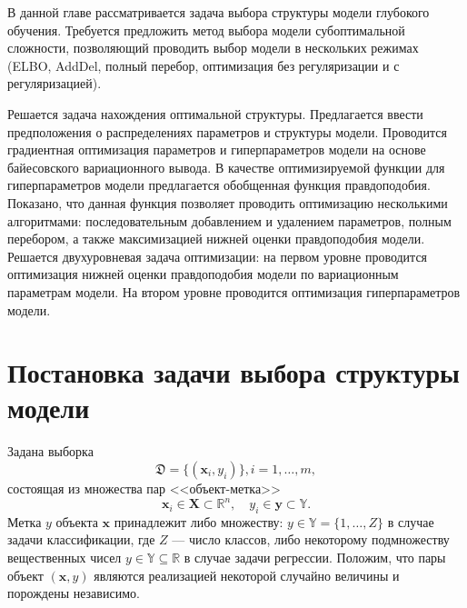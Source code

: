 В данной главе рассматривается задача выбора структуры модели глубокого обучения.  Требуется предложить метод выбора модели субоптимальной сложности, позволяющий проводить выбор модели в нескольких режимах (ELBO, AddDel, полный перебор, оптимизация без регуляризации и с регуляризацией).

Решается задача нахождения оптимальной структуры. Предлагается ввести предположения о распределениях параметров и структуры модели. 
Проводится градиентная оптимизация параметров и гиперпараметров модели на основе байесовского вариационного вывода.  В качестве оптимизируемой функции для гиперпараметров модели предлагается обобщенная функция правдоподобия. Показано, что данная функция позволяет проводить оптимизацию  несколькими алгоритмами: последовательным добавлением и удалением параметров, полным перебором, а также максимизацией нижней оценки правдоподобия модели. Решается двухуровневая задача оптимизации: на первом уровне проводится оптимизация нижней оценки правдоподобия модели по вариационным параметрам модели. На втором уровне проводится оптимизация гиперпараметров модели.



\section{Постановка задачи выбора структуры модели}
Задана выборка \begin{equation}\label{eq:dataset}\mathfrak{D} = \{(\mathbf{x}_i,y_i)\}, i = 1,\dots,m,\end{equation} состоящая из множества пар <<объект-метка>> $$\mathbf{x}_i \in \mathbf{X} \subset \mathbb{R}^n, \quad {y}_i \in \mathbf{y} \subset \mathbb{Y}.$$ Метка ${y}$  объекта $\mathbf{x}$ принадлежит либо множеству: ${y} \in \mathbb{Y} = \{1, \dots, Z\}$ в случае задачи классификации, где $Z$ --- число классов, либо некоторому подмножеству вещественных чисел ${y} \in \mathbb{Y}  \subseteq \mathbb{R}$ в случае задачи регрессии. Положим, что пары объект $(\mathbf{x}, y)$ являются реализацией некоторой случайно величины и порождены независимо.

